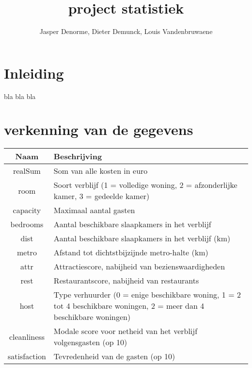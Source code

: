 \documentclass{article}
\title{project statistiek}
\author{Jasper Denorme, Dieter Demunck, Louis Vandenbruwaene}
\begin{document}
\maketitle



\section{Inleiding}
bla bla bla
\section{verkenning van de gegevens}



\begin{tabular}{c|p{10cm}}
	

	\raggedright
	   Naam & Beschrijving\\
	\hline
	
	 realSum & Som van alle kosten in euro\\ 
	 room & Soort verblijf (1 = volledige woning, 2 = afzonderlijke kamer, 
	3 = gedeelde kamer) \\ 
	 capacity & Maximaal aantal gasten \\
	 bedrooms & Aantal beschikbare slaapkamers in het verblijf \\
	 dist & Aantal beschikbare slaapkamers in het verblijf (km) \\
	 metro & Afstand tot dichtstbijzijnde metro-halte (km)\\
	 attr & Attractiescore, nabijheid van bezienswaardigheden \\
	 rest & Restaurantscore, nabijheid van restaurants \\ 
	 host & Type verhuurder (0 = enige beschikbare woning, 1 = 2 tot 4 beschikbare woningen,
	2 = meer dan 4 beschikbare woningen) \\ 
	 cleanliness & Modale score voor netheid van het verblijf volgensgasten (op 10) \\
	
	 satisfaction & Tevredenheid van de gasten (op 10)\\
  

\end{tabular}
\vspace{1cm}
\end{document}
